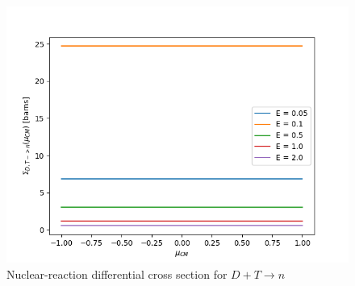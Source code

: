 \begin{figure}[!htb]
    \centering
    \includegraphics[scale=0.75]{../figures/boltzmann_model/DT_ReactionXS.png}
    \caption{Nuclear-reaction differential cross section for $D+T \rightarrow n$}
    \label{fig:sig_r}
\end{figure}